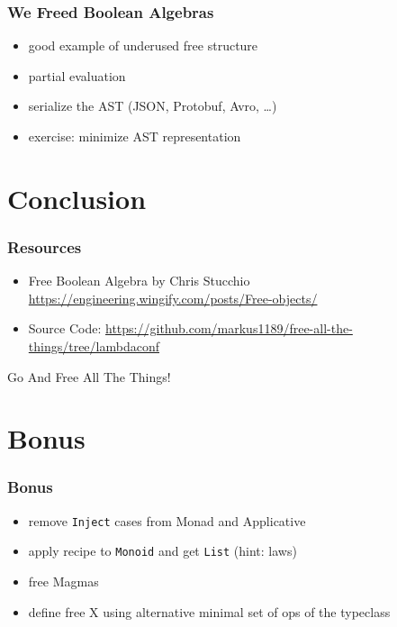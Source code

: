 \documentclass{beamer}
\begin{document}
\begin{frame}
  \frametitle{We Freed Boolean Algebras}
  \begin{itemize}
  \item good example of underused free structure
  \item partial evaluation
  \item serialize the AST (JSON, Protobuf, Avro, \ldots{})
  \item exercise: minimize AST representation
  \end{itemize}
\end{frame}

\section{Conclusion}\label{sec:conclusion}

\begin{frame}
  \frametitle{Resources}
  \begin{itemize}
  \item Free Boolean Algebra by Chris Stucchio \url{https://engineering.wingify.com/posts/Free-objects/}
  \item Source Code: \url{https://github.com/markus1189/free-all-the-things/tree/lambdaconf}
  \end{itemize}
\end{frame}

\begin{frame}
  \begin{center}
    \Huge
    Go And Free All The Things!
  \end{center}
\end{frame}

\begin{frame}
  \tableofcontents{}
\end{frame}

\appendix{}

\section*{Bonus}\label{sec:bonus}

\begin{frame}
  \frametitle{Bonus}
  \begin{itemize}
  \item remove \texttt{Inject} cases from Monad and Applicative
  \item apply recipe to \texttt{Monoid} and get \texttt{List} (hint: laws)
  \item free Magmas
  \item define free X using alternative minimal set of ops of the typeclass
  \end{itemize}
\end{frame}
\end{document}
